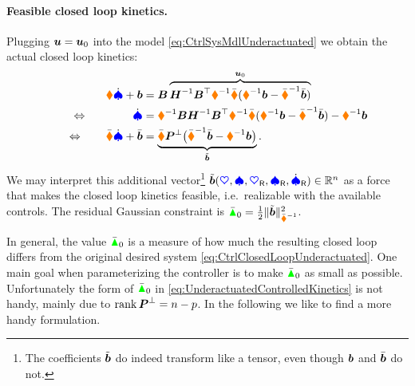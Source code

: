 \paragraph{Feasible closed loop kinetics.}
Plugging $\sysInput = \sysInput_0$ into the model \eqref{eq:CtrlSysMdlUnderactuated} we obtain the actual closed loop kinetics:
\begin{align}\label{eq:UnderactuatedControlledKinetics}
 \sysInertiaMat \sysVeld + \sysForce &= \sysInputMat \overbrace{\mat{H}^{-1} \sysInputMat^\top \sysInertiaMat^{-1} \sysInertiaMatC (\sysInertiaMat^{-1}\sysForce - \sysInertiaMatC^{-1}\sysForceC)}^{\sysInput_0}
\nonumber\\
\Leftrightarrow \qquad \qquad 
 \sysVeld &= \sysInertiaMat^{-1} \sysInputMat \mat{H}^{-1} \sysInputMat^\top \sysInertiaMat^{-1} \sysInertiaMatC (\sysInertiaMat^{-1}\sysForce - \sysInertiaMatC^{-1}\sysForceC) - \sysInertiaMat^{-1} \sysForce
\nonumber\\
\qquad \Leftrightarrow \qquad
 \sysInertiaMatC \sysVeld + \sysForceC &= \underbrace{\sysInertiaMatC \mat{P}^\bot \big( \sysInertiaMatC^{-1} \sysForceC - \sysInertiaMat^{-1} \sysForce \big)}_{\tilde{\sysForce}}.
\end{align}
We may interpret this additional vector\footnote{The coefficients $\tilde{\tuple{b}}$ do indeed transform like a tensor, even though $\sysForce$ and $\sysForceC$ do not.}
$\tilde{\tuple{b}}(\sysCoord, \sysVel, \sysCoordR, \sysVelR, \sysVelRd) \in \RealNum^{\dimConfigSpace}$ as a force that makes the closed loop kinetics feasible, i.e.\ realizable with the available controls.
The residual Gaussian constraint is $\GaussianConstraintC_0 = \tfrac{1}{2} \norm[\sysInertiaMatC^{-1}]{\tilde{\sysForce}}^2$.

In general, the value $\GaussianConstraintC_0$ is a measure of how much the resulting closed loop differs from the original desired system \eqref{eq:CtrlClosedLoopUnderactuated}.
One main goal when parameterizing the controller is to make $\GaussianConstraintC_0$ as small as possible.
Unfortunately the form of $\GaussianConstraintC_0$ in \eqref{eq:UnderactuatedControlledKinetics} is not handy, mainly due to $\rank \mat{P}^\bot = \dimConfigSpace - \numInputs$.
In the following we like to find a more handy formulation.

